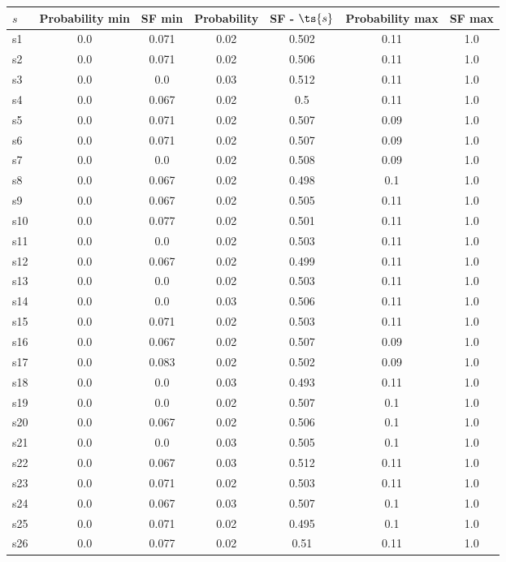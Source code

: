 \documentclass{article}
\begin{document}
\noindent\begin{tabular}{|l|c|c|c|c|c|c|}
\hline
$s$& Probability min & SF min & Probability & SF - $\ts{s}$ & Probability max & SF max\\
\hline
s1 &0.0 & 0.071 & 0.02 & 0.502 & 0.11 & 1.0\\
\hline
s2 &0.0 & 0.071 & 0.02 & 0.506 & 0.11 & 1.0\\
\hline
s3 &0.0 & 0.0 & 0.03 & 0.512 & 0.11 & 1.0\\
\hline
s4 &0.0 & 0.067 & 0.02 & 0.5 & 0.11 & 1.0\\
\hline
s5 &0.0 & 0.071 & 0.02 & 0.507 & 0.09 & 1.0\\
\hline
s6 &0.0 & 0.071 & 0.02 & 0.507 & 0.09 & 1.0\\
\hline
s7 &0.0 & 0.0 & 0.02 & 0.508 & 0.09 & 1.0\\
\hline
s8 &0.0 & 0.067 & 0.02 & 0.498 & 0.1 & 1.0\\
\hline
s9 &0.0 & 0.067 & 0.02 & 0.505 & 0.11 & 1.0\\
\hline
s10 &0.0 & 0.077 & 0.02 & 0.501 & 0.11 & 1.0\\
\hline
s11 &0.0 & 0.0 & 0.02 & 0.503 & 0.11 & 1.0\\
\hline
s12 &0.0 & 0.067 & 0.02 & 0.499 & 0.11 & 1.0\\
\hline
s13 &0.0 & 0.0 & 0.02 & 0.503 & 0.11 & 1.0\\
\hline
s14 &0.0 & 0.0 & 0.03 & 0.506 & 0.11 & 1.0\\
\hline
s15 &0.0 & 0.071 & 0.02 & 0.503 & 0.11 & 1.0\\
\hline
s16 &0.0 & 0.067 & 0.02 & 0.507 & 0.09 & 1.0\\
\hline
s17 &0.0 & 0.083 & 0.02 & 0.502 & 0.09 & 1.0\\
\hline
s18 &0.0 & 0.0 & 0.03 & 0.493 & 0.11 & 1.0\\
\hline
s19 &0.0 & 0.0 & 0.02 & 0.507 & 0.1 & 1.0\\
\hline
s20 &0.0 & 0.067 & 0.02 & 0.506 & 0.1 & 1.0\\
\hline
s21 &0.0 & 0.0 & 0.03 & 0.505 & 0.1 & 1.0\\
\hline
s22 &0.0 & 0.067 & 0.03 & 0.512 & 0.11 & 1.0\\
\hline
s23 &0.0 & 0.071 & 0.02 & 0.503 & 0.11 & 1.0\\
\hline
s24 &0.0 & 0.067 & 0.03 & 0.507 & 0.1 & 1.0\\
\hline
s25 &0.0 & 0.071 & 0.02 & 0.495 & 0.1 & 1.0\\
\hline
s26 &0.0 & 0.077 & 0.02 & 0.51 & 0.11 & 1.0\\

\end{tabular}
\end{document}
